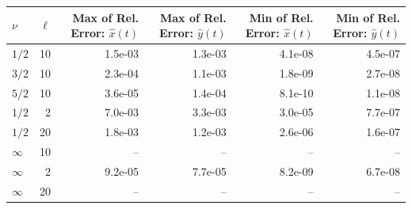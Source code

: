\begin{tabular}{lrrrrr}
\toprule
$\nu$ & $\ell$ & Max of Rel. Error: $\hat{x}(t)$ & Max of Rel. Error: $\hat{y}(t)$ & Min of Rel. Error: $\hat{x}(t)$ & Min of Rel. Error: $\hat{y}(t)$ \\
\midrule
$1/2$ & 10 & 1.5e-03 & 1.3e-03 & 4.1e-08 & 4.5e-07 \\
$3/2$ & 10 & 2.3e-04 & 1.1e-03 & 1.8e-09 & 2.7e-08 \\
$5/2$ & 10 & 3.6e-05 & 1.4e-04 & 8.1e-10 & 1.1e-08 \\
$1/2$ & 2 & 7.0e-03 & 3.3e-03 & 3.0e-05 & 7.7e-07 \\
$1/2$ & 20 & 1.8e-03 & 1.2e-03 & 2.6e-06 & 1.6e-07 \\
$\infty$ & 10 & -- & -- & -- & -- \\
$\infty$ & 2 & 9.2e-05 & 7.7e-05 & 8.2e-09 & 6.7e-08 \\
$\infty$ & 20 & -- & -- & -- & -- \\
\bottomrule
\end{tabular}
